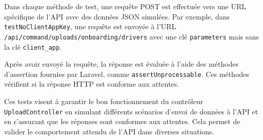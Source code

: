 Dans chaque méthode de test, une requête POST est effectuée vers une URL spécifique de l'API avec des données JSON simulées. Par exemple, dans \Verb|testNoClientAppKey|, une requête est envoyée à l'URL \Verb|/api/command/uploads/onboarding/drivers| avec une clé \Verb|parameters| mais sans la clé \Verb|client_app|.

Après avoir envoyé la requête, la réponse est évaluée à l'aide des méthodes d'assertion fournies par Laravel, comme \Verb|assertUnprocessable|. Ces méthodes vérifient si la réponse HTTP est conforme aux attentes.

Ces tests visent à garantir le bon fonctionnement du contrôleur \Verb|UploadController| en simulant différents scénarios d'envoi de données à l'API et en s'assurant que les réponses sont conformes aux attentes. Cela permet de valider le comportement attendu de l'API dans diverses situations.